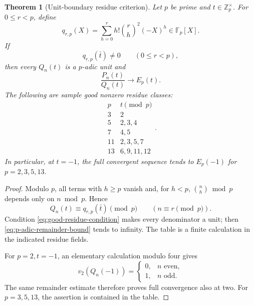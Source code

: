 \documentclass[11pt]{article}
\theoremstyle{keio}
\newtheorem{theorem}{Theorem}[section]
\theoremstyle{definition}
\theoremstyle{remark}
\newcommand{\Z}{\mathbb Z}
\begin{document}
\begin{theorem}[Unit-boundary residue criterion]
\label{thm:p-adic-unit-criterion}
Let \(p\) be prime and \(t\in\Z_p^\times\).  For
\(0\le r<p\), define
\begin{equation}\label{eq:q-rp}
 q_{r,p}(X)=\sum_{h=0}^rh!\binom rh^2(-X)^h\in\mathbb F_p[X].
\end{equation}
If
\begin{equation}\label{eq:good-residue-condition}
 q_{r,p}(\bar t)\ne0\qquad(0\le r<p),
\end{equation}
then every \(Q_n(t)\) is a \(p\)-adic unit and
\begin{equation}\label{eq:full-p-adic-convergence}
 \boxed{\displaystyle
 \frac{P_n(t)}{Q_n(t)}\longrightarrow E_p(t).}
\end{equation}
The following are sample good nonzero residue classes:
\begin{equation}\label{eq:good-residue-table}
 \begin{array}{c|c}
 p&t\pmod p\\ \hline
 3&2\\
 5&2,3,4\\
 7&4,5\\
 11&2,3,5,7\\
 13&6,9,11,12
 \end{array}.
\end{equation}
In particular, at \(t=-1\), the full convergent sequence tends to
\(E_p(-1)\) for \(p=2,3,5,13\).
\end{theorem}

\begin{proof}
Modulo \(p\), all terms with \(h\ge p\) vanish and, for \(h<p\),
\(\binom nh\bmod p\) depends only on \(n\bmod p\).  Hence
\begin{equation}\label{eq:Q-period-p}
 Q_n(t)\equiv q_{r,p}(\bar t)\pmod p
 \qquad(n\equiv r\pmod p).
\end{equation}
Condition \eqref{eq:good-residue-condition} makes every denominator a unit;
then \eqref{eq:p-adic-remainder-bound} tends to infinity.  The table is a
finite calculation in the indicated residue fields.

For \(p=2,t=-1\), an elementary calculation modulo four gives
\begin{equation}\label{eq:Q-v2}
 v_2(Q_n(-1))=
 \begin{cases}0,&n\text{ even},\\1,&n\text{ odd}.
 \end{cases}
\end{equation}
The same remainder estimate therefore proves full convergence also at two.
For \(p=3,5,13\), the assertion is contained in the table.
\end{proof}
\end{document}
